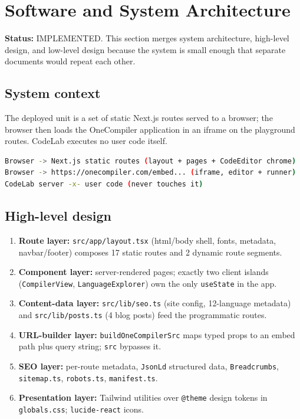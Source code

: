 \section{Software and System Architecture}
\label{sec:software-architecture}

\textbf{Status:} IMPLEMENTED. This section merges system architecture, high-level design, and low-level design because the system is small enough that separate documents would repeat each other.

\subsection{System context}
The deployed unit is a set of static Next.js routes served to a browser; the browser then loads the OneCompiler application in an iframe on the playground routes. CodeLab executes no user code itself.

\begin{lstlisting}[language=bash,caption={System context (text diagram; Mermaid source in diagrams/system-context.mmd)}]
Browser -> Next.js static routes (layout + pages + CodeEditor chrome)
Browser -> https://onecompiler.com/embed... (iframe, editor + runner)
CodeLab server -x- user code (never touches it)
\end{lstlisting}

\subsection{High-level design}
\begin{enumerate}
\item \textbf{Route layer:} \texttt{src/app/layout.tsx} (html/body shell, fonts, metadata, navbar/footer) composes 17 static routes and 2 dynamic route segments.
\item \textbf{Component layer:} server-rendered pages; exactly two client islands (\texttt{CompilerView}, \texttt{LanguageExplorer}) own the only \texttt{useState} in the app.
\item \textbf{Content-data layer:} \texttt{src/lib/seo.ts} (site config, 12-language metadata) and \texttt{src/lib/posts.ts} (4 blog posts) feed the programmatic routes.
\item \textbf{URL-builder layer:} \texttt{buildOneCompilerSrc} maps typed props to an embed path plus query string; \texttt{src} bypasses it.
\item \textbf{SEO layer:} per-route metadata, \texttt{JsonLd} structured data, \texttt{Breadcrumbs}, \texttt{sitemap.ts}, \texttt{robots.ts}, \texttt{manifest.ts}.
\item \textbf{Presentation layer:} Tailwind utilities over \texttt{@theme} design tokens in \texttt{globals.css}; \texttt{lucide-react} icons.
\end{enumerate}

